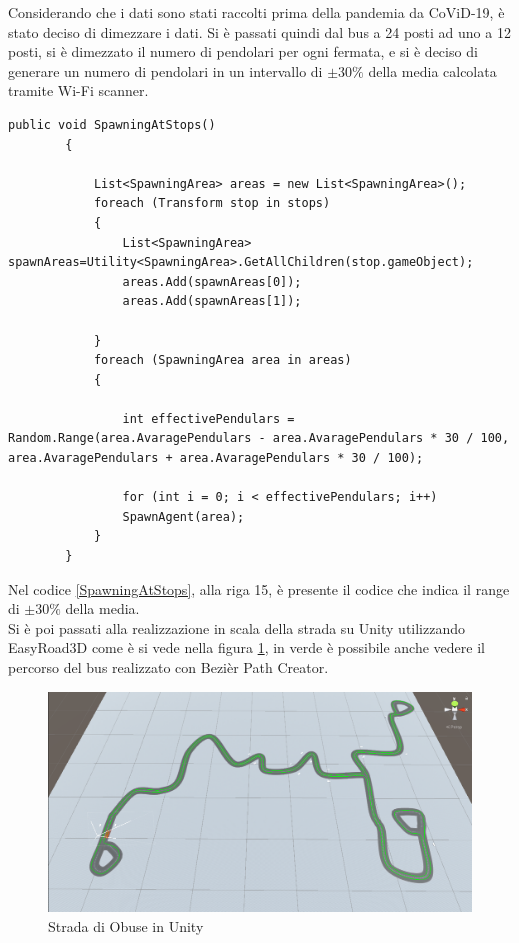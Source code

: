 \documentclass[12pt, openany]{book}
\begin{document}
 	Considerando che i dati sono stati raccolti prima della pandemia da CoViD-19, è stato deciso di dimezzare i dati. Si è passati quindi dal bus a 24 posti ad uno a 12 posti, si è dimezzato il numero di pendolari per ogni fermata, e si è deciso di generare un numero di pendolari in un intervallo di $\pm30\%$ della media calcolata tramite Wi-Fi scanner.
 	\begin{lstlisting}[language={[Sharp]C}, 
 		caption={Genera i pendolari alle fermate}, label={SpawningAtStops}]
 		   public void SpawningAtStops()
 		{
 			
 			List<SpawningArea> areas = new List<SpawningArea>();
 			foreach (Transform stop in stops)
 			{
 				List<SpawningArea> spawnAreas=Utility<SpawningArea>.GetAllChildren(stop.gameObject);
 				areas.Add(spawnAreas[0]);
 				areas.Add(spawnAreas[1]);
 				
 			}
 			foreach (SpawningArea area in areas)
 			{
 				
 				int effectivePendulars = Random.Range(area.AvaragePendulars - area.AvaragePendulars * 30 / 100, area.AvaragePendulars + area.AvaragePendulars * 30 / 100);
 				
 				for (int i = 0; i < effectivePendulars; i++)
 				SpawnAgent(area);
 			}
 		}
 	\end{lstlisting}
 	Nel codice \ref{SpawningAtStops}, alla riga 15, è presente il codice che indica il range di $\pm30\%$ della media.\\
 	Si è poi passati alla realizzazione in scala della strada su Unity utilizzando EasyRoad3D come è si vede nella figura \ref{fig:ObuseStreet}, in verde è possibile anche vedere il percorso del bus realizzato con Bezièr Path Creator. 
 	\begin{figure}[H]
 		\centering
 		\includegraphics[width=1\linewidth]{"Immagini/ObuseStreet.png"}
 		\caption{Strada di Obuse in Unity}
 		\label{fig:ObuseStreet}
 	\end{figure}
 
\end{document}
